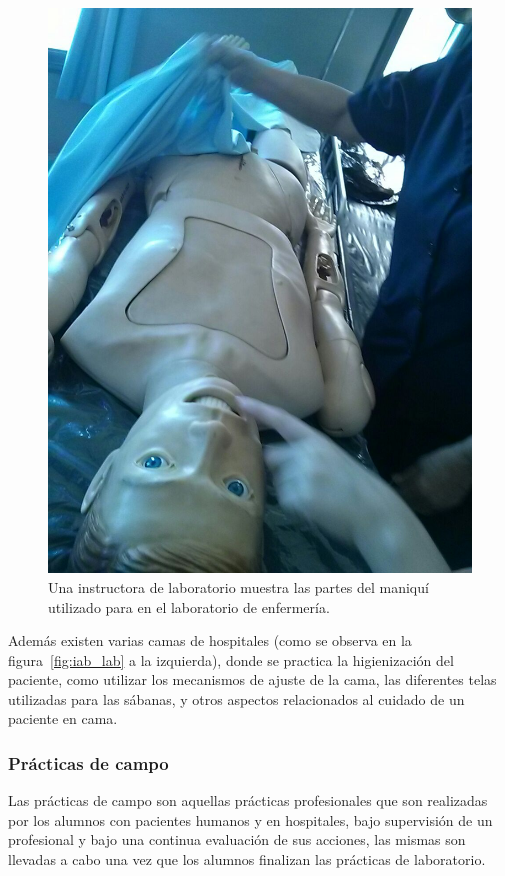 \begin{figure}[b!t] 
\centering 
\includegraphics[scale=0.15]{problema/iab_sala_3.jpg}
\caption{Una instructora de laboratorio muestra las partes del maniquí utilizado
    para en el laboratorio de enfermería.}
\label{fig:iab_mani}
\end{figure}

Además existen varias camas de hospitales (como se observa en la
figura~\ref{fig:iab_lab} a la izquierda), donde se practica la higienización del
paciente, como utilizar los mecanismos de ajuste de la cama, las diferentes
telas utilizadas para las sábanas, y otros aspectos relacionados al cuidado de
un paciente en cama.


\subsubsection{Prácticas de campo}
\label{sec:practica_hos}

Las prácticas de campo son aquellas prácticas profesionales que son
realizadas por los alumnos con pacientes humanos y en hospitales, bajo
supervisión de un profesional y bajo una continua evaluación de sus
acciones, las mismas son llevadas a cabo una vez que los alumnos finalizan
las prácticas de laboratorio.


